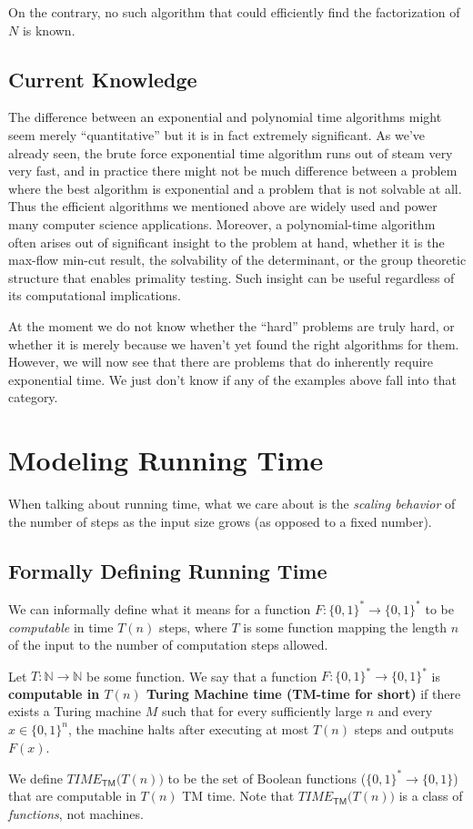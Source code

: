 \documentclass{article}
\begin{document}
  On the contrary, no such algorithm that could efficiently find the factorization of $N$ is known. 

  \subsection{Current Knowledge}
  The difference between an exponential and polynomial time algorithms might seem merely “quantitative” but it is in fact extremely significant. As we’ve already seen, the brute force exponential time algorithm runs out of steam very very fast, and in practice there might not be much difference between a problem where the best algorithm is exponential and a problem that is not solvable at all. Thus the efficient algorithms we mentioned above are widely used and power many computer science applications. Moreover, a polynomial-time algorithm often arises out of significant insight to the problem at hand, whether it is the max-flow min-cut result, the solvability of the determinant, or the group theoretic structure that enables primality testing. Such insight can be useful regardless of its computational implications. 

  At the moment we do not know whether the “hard” problems are truly hard, or whether it is merely because we haven’t yet found the right algorithms for them. However, we will now see that there are problems that do inherently require exponential time. We just don’t know if any of the examples above fall into that category. 

\section{Modeling Running Time}

  When talking about running time, what we care about is the \textit{scaling behavior} of the number of steps as the input size grows (as opposed to a fixed number). 

  \subsection{Formally Defining Running Time}
  We can informally define what it means for a function $F: \{0,1\}^* \longrightarrow \{0,1\}^*$ to be \textit{computable} in time $T(n)$ steps, where $T$ is some function mapping the length $n$ of the input to the number of computation steps allowed. 

  \begin{definition}
  Let $T: \mathbb{N} \longrightarrow \mathbb{N}$ be some function. We say that a function $F: \{0,1\}^* \longrightarrow \{0,1\}^*$ is \textbf{computable in $T(n)$ Turing Machine time (TM-time for short)} if there exists a Turing machine $M$ such that for every sufficiently large $n$ and every $x \in \{0,1\}^n$, the machine halts after executing at most $T(n)$ steps and outputs $F(x)$. 

  We define $TIME_{\mathsf{TM}}\big(T(n)\big)$ to be the set of Boolean functions ($\{0,1\}^* \longrightarrow \{0,1\}$) that are computable in $T(n)$ TM time. Note that $TIME_{\mathsf{TM}}\big(T(n)\big)$ is a class of \textit{functions}, not machines. 
  \end{definition}
\end{document}

